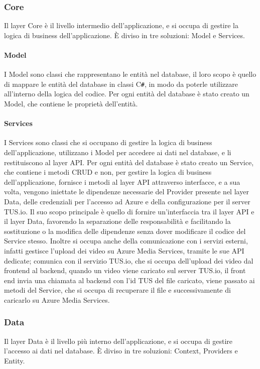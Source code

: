 \subsubsection{Core}
Il layer Core è il livello intermedio dell'applicazione, e si occupa di gestire la logica di business dell'applicazione. È diviso in tre soluzioni: Model e Services.\\

\paragraph{Model}
I Model sono classi che rappresentano le entità nel database, il loro scopo è quello di mappare le entità del database in classi C\texttt{\#}, in modo da poterle utilizzare all'interno della logica del codice. Per ogni entità del database è stato creato un Model, che contiene le proprietà dell'entità.\\

\paragraph{Services}
I Services sono classi che si occupano di gestire la logica di business dell'applicazione, utilizzano i Model per accedere ai dati nel database, e li restituiscono al layer API. Per ogni entità del database è stato creato un Service, che contiene i metodi CRUD e non, per gestire la logica di business dell'applicazione, fornisce i metodi al layer API attraverso interfacce, e a sua volta, vengono iniettate le dipendenze necessarie del Provider presente nel layer Data, delle credenziali per l'accesso ad Azure e della configurazione per il server TUS.io. Il suo scopo principale è quello di fornire un'interfaccia tra il layer API e il layer Data, favorendo la separazione delle responsabilità e facilitando la sostituzione o la modifica delle dipendenze senza dover modificare il codice del Service stesso. Inoltre si occupa anche della comunicazione con i servizi esterni, infatti gestisce l'upload dei video su Azure Media Services, tramite le sue API dedicate; comunica con il servizio TUS.io, che si occupa dell'upload dei video dal frontend al backend, quando un video viene caricato sul server TUS.io, il front end invia una chiamata al backend con l'id TUS del file caricato, viene passato ai metodi del Service, che si occupa di recuperare il file e successivamente di caricarlo su Azure Media Services.\\

\subsubsection{Data}
Il layer Data è il livello più interno dell'applicazione, e si occupa di gestire l'accesso ai dati nel database. È diviso in tre soluzioni: Context, Providers e Entity.\\

